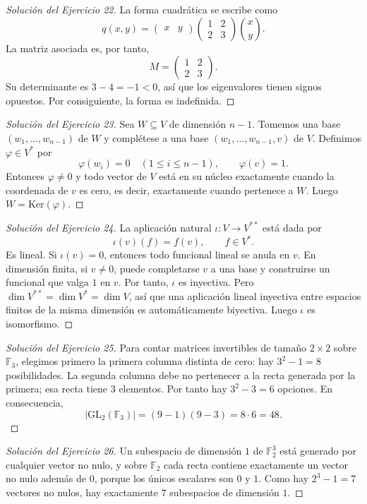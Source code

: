 \documentclass[10pt,a4paper,oneside]{article}
\theoremstyle{plain}
\theoremstyle{definition}
\theoremstyle{remark}
\newcommand{\F}{\mathbb{F}}
\newcommand{\Ker}{\mathrm{Ker}}
\newcommand{\GL}{\mathrm{GL}}
\begin{document}
\begin{proof}[Solución del Ejercicio 22]
La forma cuadrática se escribe como
\[q(x,y)=\begin{pmatrix}x&y\end{pmatrix}\begin{pmatrix}1&2\\2&3\end{pmatrix}\binom{x}{y}.
\]
La matriz asociada es, por tanto,
\[M=\begin{pmatrix}1&2\\2&3\end{pmatrix}.
\]
Su determinante es \(3-4=-1<0\), así que los eigenvalores tienen signos opuestos. Por consiguiente, la forma es indefinida.
\end{proof}
\begin{proof}[Solución del Ejercicio 23]
Sea \(W\subseteq V\) de dimensión \(n-1\). Tomemos una base \((w_1,\dots,w_{n-1})\) de \(W\) y complétese a una base \((w_1,\dots,w_{n-1},v)\) de \(V\). Definimos \(\varphi\in V^*\) por
\[\varphi(w_i)=0\quad (1\le i\le n-1),\qquad \varphi(v)=1.
\]
Entonces \(\varphi\neq0\) y todo vector de \(V\) está en su núcleo exactamente cuando la coordenada de \(v\) es cero, es decir, exactamente cuando pertenece a \(W\). Luego \(W=\Ker(\varphi)\).
\end{proof}
\begin{proof}[Solución del Ejercicio 24]
La aplicación natural \(\iota:V\to V^{**}\) está dada por
\[\iota(v)(f)=f(v),\qquad f\in V^*.
\]
Es lineal. Si \(\iota(v)=0\), entonces todo funcional lineal se anula en \(v\). En dimensión finita, si \(v\neq0\), puede completarse \(v\) a una base y construirse un funcional que valga \(1\) en \(v\). Por tanto, \(\iota\) es inyectiva. Pero \(\dim V^{**}=\dim V^*=\dim V\), así que una aplicación lineal inyectiva entre espacios finitos de la misma dimensión es automáticamente biyectiva. Luego \(\iota\) es isomorfismo.
\end{proof}
\begin{proof}[Solución del Ejercicio 25]
Para contar matrices invertibles de tamaño \(2\times2\) sobre \(\F_3\), elegimos primero la primera columna distinta de cero: hay \(3^2-1=8\) posibilidades. La segunda columna debe no pertenecer a la recta generada por la primera; esa recta tiene \(3\) elementos. Por tanto hay \(3^2-3=6\) opciones. En consecuencia,
\[|\GL_2(\F_3)|=(9-1)(9-3)=8\cdot 6=48.
\]
\end{proof}
\begin{proof}[Solución del Ejercicio 26]
Un subespacio de dimensión \(1\) de \(\F_2^3\) está generado por cualquier vector no nulo, y sobre \(\F_2\) cada recta contiene exactamente un vector no nulo además de \(0\), porque los únicos escalares son \(0\) y \(1\). Como hay \(2^3-1=7\) vectores no nulos, hay exactamente \(7\) subespacios de dimensión \(1\).
\end{proof}
\end{document}

